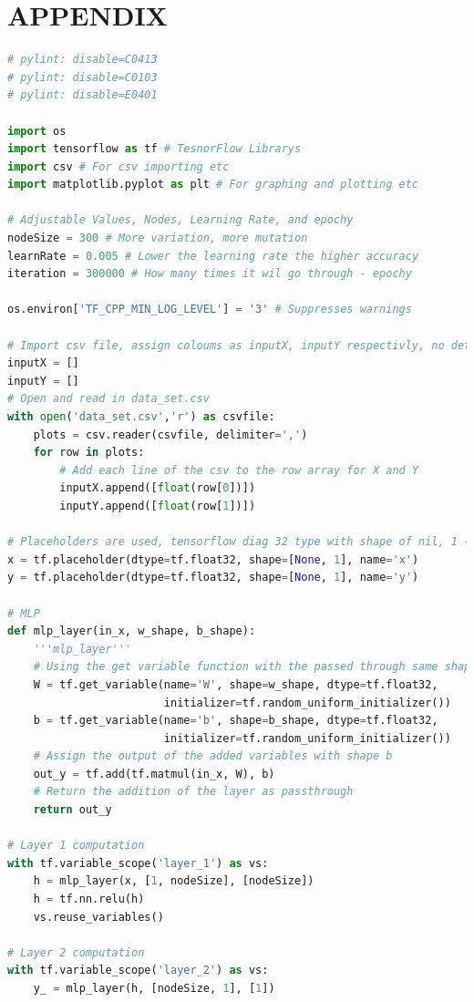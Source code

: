\documentclass[a4paper, 10pt]{IEEEconf}
\begin{document}
\section*{APPENDIX}
\begin{lstlisting}[language = Python]
# pylint: disable=C0413
# pylint: disable=C0103
# pylint: disable=E0401

import os
import tensorflow as tf # TesnorFlow Librarys
import csv # For csv importing etc
import matplotlib.pyplot as plt # For graphing and plotting etc

# Adjustable Values, Nodes, Learning Rate, and epochy 
nodeSize = 300 # More variation, more mutation
learnRate = 0.005 # Lower the learning rate the higher accuracy
iteration = 300000 # How many times it wil go through - epochy

os.environ['TF_CPP_MIN_LOG_LEVEL'] = '3' # Suppresses warnings

# Import csv file, assign coloums as inputX, inputY respectivly, no determined allocation size for memory
inputX = [] 
inputY = [] 
# Open and read in data_set.csv
with open('data_set.csv','r') as csvfile: 
    plots = csv.reader(csvfile, delimiter=',') 
    for row in plots: 
		# Add each line of the csv to the row array for X and Y
        inputX.append([float(row[0])]) 
        inputY.append([float(row[1])])

# Placeholders are used, tensorflow diag 32 type with shape of nil, 1 - labeled x and y respectivly
x = tf.placeholder(dtype=tf.float32, shape=[None, 1], name='x')
y = tf.placeholder(dtype=tf.float32, shape=[None, 1], name='y')

# MLP
def mlp_layer(in_x, w_shape, b_shape):
    '''mlp_layer'''
	# Using the get variable function with the passed through same shapes and random initializer with no conditions
    W = tf.get_variable(name='W', shape=w_shape, dtype=tf.float32,
                        initializer=tf.random_uniform_initializer())
    b = tf.get_variable(name='b', shape=b_shape, dtype=tf.float32,
                        initializer=tf.random_uniform_initializer())
	# Assign the output of the added variables with shape b					
    out_y = tf.add(tf.matmul(in_x, W), b)
	# Return the addition of the layer as passthrough
    return out_y

# Layer 1 computation
with tf.variable_scope('layer_1') as vs:
    h = mlp_layer(x, [1, nodeSize], [nodeSize])
    h = tf.nn.relu(h)
    vs.reuse_variables()

# Layer 2 computation
with tf.variable_scope('layer_2') as vs:
    y_ = mlp_layer(h, [nodeSize, 1], [1])


\end{lstlisting}
\end{document}
